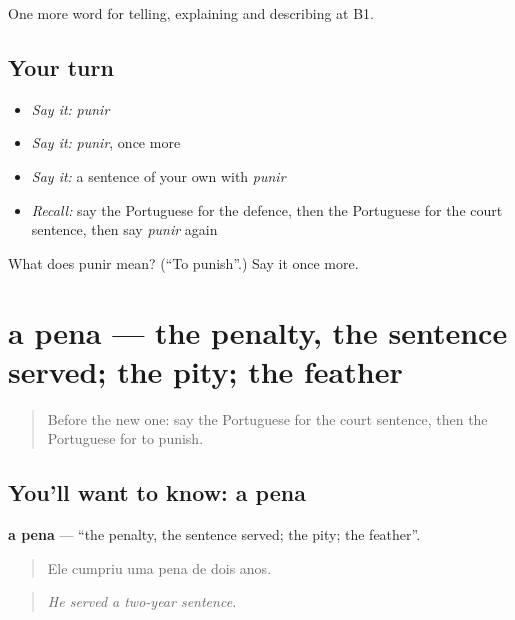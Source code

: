 \begin{grammarlens}[title={What you've built}]
One more word for telling, explaining and describing at B1.
\end{grammarlens}

\subsection*{Your turn}
\begin{itemize}
\raggedright
  \item \emph{Say it:} \emph{punir}
  \item \emph{Say it:} \emph{punir}, once more
  \item \emph{Say it:} a sentence of your own with \emph{punir}
  \item \emph{Recall:} say the Portuguese for the defence, then the Portuguese for the court sentence, then say \emph{punir} again
\end{itemize}

\begin{tcolorbox}[breakable,colback=teal!4,colframe=teal!35!black,title={Before you move on}]
What does punir mean? (\textquotedblleft{}To punish\textquotedblright{}.) Say it once more.
\end{tcolorbox}
\section[a pena]{a pena — the penalty, the sentence served; the pity; the feather}

\label{lesson:PT-C388-pena}



\begin{quote}
Before the new one: say the Portuguese for the court sentence, then the Portuguese for to punish.
\end{quote}

\subsection*{You'll want to know: a pena}
\textbf{a pena} — \textquotedblleft{}the penalty, the sentence served; the pity; the feather\textquotedblright{}.

\begin{quote}
Ele cumpriu uma pena de dois anos.
\end{quote}

\begin{quote}
\emph{He served a two-year sentence.}
\end{quote}

